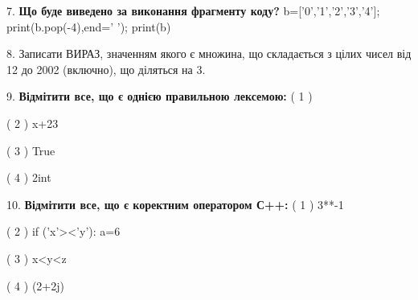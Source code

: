 \documentclass[11pt]{article}
\begin{document}
\vspace{5mm}

7. \textbf{Що буде виведено за виконання фрагменту коду?}
b=['0','1','2','3','4']; print(b.pop(-4),end=' '); print(b)\vspace{5mm}

8. 
Записати ВИРАЗ, значенням якого є множина, що складається з цілих чисел від 12 до 2002 (включно), що діляться на 3.\vspace{5mm}

9. %
\textbf{Відмітити все, що є однією правильною лексемою:}
( 1 ) %

( 2 ) x+23

( 3 ) True

( 4 ) 2int
\vspace{5mm}

10. %
\textbf{Відмітити все, що є коректним оператором С++:}
( 1 ) 3**-1

( 2 ) if ('x'><'y'): a=6

( 3 ) x<y<z

( 4 ) (2+2j)%
\vspace{5mm}

\newpage
\end{document}
